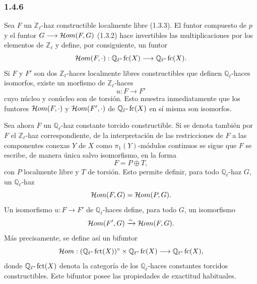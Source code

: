\subsubsection*{1.4.6}
Sea \(F\) un \(\mathbb Z_\ell\)-haz constructible localmente libre (1.3.3). El funtor compuesto de \(p\) y el funtor \(G\longrightarrow\mathcal{H}om(F,G)\) (1.3.2) hace invertibles las multiplicaciones por los elementos de \(\mathbb Z_\ell\) y define, por consiguiente, un funtor
\[
\mathcal{H}om(F,\cdot):\mathbb Q_\ell\text{-}\operatorname{fc}(X)\longrightarrow \mathbb Q_\ell\text{-}\operatorname{fc}(X).
\]
Si \(F\) y \(F'\) son dos \(\mathbb Z_\ell\)-haces localmente libres constructibles que definen \(\mathbb Q_\ell\)-haces isomorfos, existe un morfismo de \(\mathbb Z_\ell\)-haces
\[
u:F\longrightarrow F'
\]
cuyo núcleo y conúcleo son de torsión. Esto muestra inmediatamente que los funtores \(\mathcal{H}om(F,\cdot)\) y \(\mathcal{H}om(F',\cdot)\) de \(\mathbb Q_\ell\text{-}\operatorname{fc}(X)\) en sí misma son isomorfos.

Sea ahora \(F\) un \(\mathbb Q_\ell\)-haz constante torcido constructible. Si se denota también por \(F\) el \(\mathbb Z_\ell\)-haz correspondiente, de la interpretación de las restricciones de \(F\) a las componentes conexas \(Y\) de \(X\) como \(\pi_1(Y)\)-módulos continuos se sigue que \(F\) se escribe, de manera única salvo isomorfismo, en la forma
\[
F=P\oplus T,
\]
con \(P\) localmente libre y \(T\) de torsión. Esto permite definir, para todo \(\mathbb Q_\ell\)-haz \(G\), un \(\mathbb Q_\ell\)-haz
\[
\mathcal{H}om(F,G)=\mathcal{H}om(P,G).
\]
Un isomorfismo \(u:F\to F'\) de \(\mathbb Q_\ell\)-haces define, para todo \(G\), un isomorfismo
\[
\mathcal{H}om(F',G)\xrightarrow{\sim}\mathcal{H}om(F,G).
\]
Más precisamente, se define así un bifuntor
\[
\mathcal{H}om:(\mathbb Q_\ell\text{-}\operatorname{fct}(X))^\circ\times \mathbb Q_\ell\text{-}\operatorname{fc}(X)
\longrightarrow \mathbb Q_\ell\text{-}\operatorname{fc}(X),
\]
donde \(\mathbb Q_\ell\text{-}\operatorname{fct}(X)\) denota la categoría de los \(\mathbb Q_\ell\)-haces constantes torcidos constructibles. Este bifuntor posee las propiedades de exactitud habituales.
